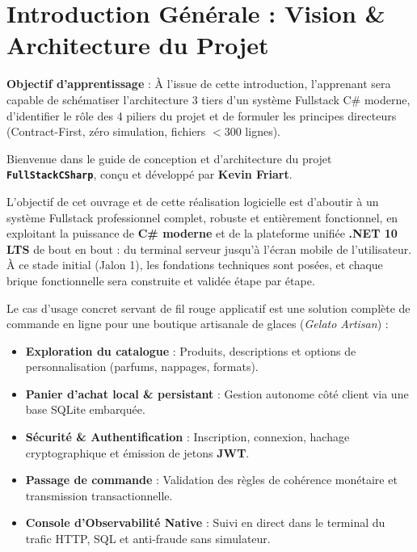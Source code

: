 \documentclass[a4paper,11pt]{report}
\begin{document}
\tableofcontents
\newpage

\chapter*{Introduction Générale : Vision \& Architecture du Projet}

\begin{tcolorbox}[colback=indigo!4!white,colframe=indigo!40!white,arc=2mm,boxrule=0.8pt,top=2mm,bottom=2mm,left=3mm,right=3mm]
    \small\textbf{\color{indigo!90!black}Objectif d'apprentissage} : À l'issue de cette introduction, l'apprenant sera capable de schématiser l'architecture 3 tiers d'un système Fullstack C\# moderne, d'identifier le rôle des 4 piliers du projet et de formuler les principes directeurs (Contract-First, zéro simulation, fichiers $< 300$ lignes).
\end{tcolorbox}

\vspace{0.1cm}

Bienvenue dans le guide de conception et d'architecture du projet \textbf{\texttt{FullStackCSharp}}, conçu et développé par \textbf{Kevin Friart}.

L'objectif de cet ouvrage et de cette réalisation logicielle est d'aboutir à un système Fullstack professionnel complet, robuste et entièrement fonctionnel, en exploitant la puissance de \textbf{C\# moderne} et de la plateforme unifiée \textbf{.NET 10 LTS} de bout en bout : du terminal serveur jusqu'à l'écran mobile de l'utilisateur. À ce stade initial (Jalon 1), les fondations techniques sont posées, et chaque brique fonctionnelle sera construite et validée étape par étape.

Le cas d'usage concret servant de fil rouge applicatif est une solution complète de commande en ligne pour une boutique artisanale de glaces (\textit{Gelato Artisan}) :
\begin{itemize}
    \item \textbf{Exploration du catalogue} : Produits, descriptions et options de personnalisation (parfums, nappages, formats).
    \item \textbf{Panier d'achat local \& persistant} : Gestion autonome côté client via une base SQLite embarquée.
    \item \textbf{Sécurité \& Authentification} : Inscription, connexion, hachage cryptographique et émission de jetons \textbf{JWT}.
    \item \textbf{Passage de commande} : Validation des règles de cohérence monétaire et transmission transactionnelle.
    \item \textbf{Console d'Observabilité Native} : Suivi en direct dans le terminal du trafic HTTP, SQL et anti-fraude sans simulateur.
\end{itemize}
\end{document}
